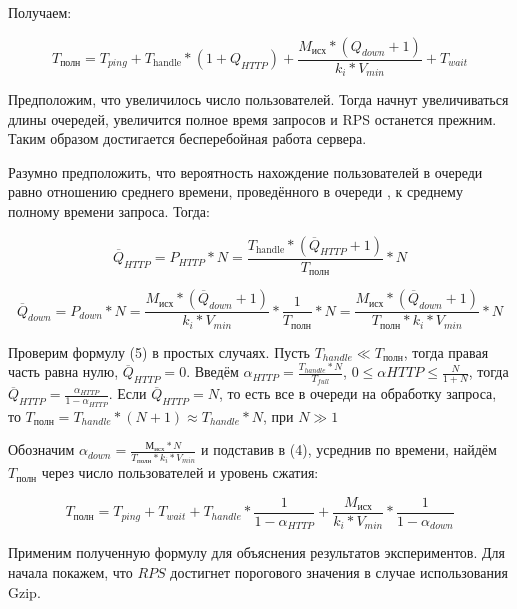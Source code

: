 \documentclass[12pt]{article}
\begin{document}
Получаем:

\[
    T_{\text{полн}} = T_{ping} + T_{\text{handle}}*(1 + Q_{HTTP}) + \frac{M_{\text{исх}}*(Q_{down} + 1)}{k_{i}*V_{min}} + T_{wait}
\]

Предположим, что увеличилось число пользователей. Тогда начнут увеличиваться длины очередей, увеличится полное время запросов
и RPS останется прежним. Таким образом достигается бесперебойная работа сервера.

Разумно предположить, что вероятность нахождение пользователей в очереди равно отношению среднего времени, проведённого в очереди
, к среднему полному времени запроса. Тогда:

\begin{equation}
    \overline{Q}_{HTTP} = P_{HTTP} * N = \frac{T_{\text{handle}} * (\overline{Q}_{HTTP} + 1)}{T_{\text{полн}}} * N
\end{equation}

\begin{equation}
    \overline{Q}_{down} = P_{down} * N = \frac{M_{\text{исх}}*(\overline{Q}_{down} + 1)}{k_{i}*V_{min}} * \frac{1}{T_{\text{полн}}} * N = \frac{M_{\text{исх}}*(\overline{Q}_{down} + 1)}{T_{\text{полн}} * k_{i}*V_{min}} * N
\end{equation}

\begin{spacing}{2.0}
    Проверим формулу (5) в простых случаях. Пусть $T_{handle} \ll T_{\text{полн}}$, тогда правая часть равна нулю, $\overline{Q}_{HTTP} = 0$.
    Введём $\alpha_{HTTP} = \frac{T_{handle} * N}{T_{full}}$, $0 \le \alpha{HTTP} \le \frac{N}{1+N}$, тогда $\overline{Q}_{HTTP} = \frac{\alpha_{HTTP}}{1 - \alpha_{HTTP}}$.
    Если $\overline{Q}_{HTTP} = N$, то есть все в очереди на обработку запроса,
    то $T_{\text{полн}} = T_{handle}*(N+1) \approx T_{handle}*N$, при  $N \gg 1$
\end{spacing}

Обозначим $\alpha_{down} = \frac{М_{\text{исх}} * N}{T_{\text{полн}}*k_{i}*V_{min}}$ и подставив в (4),
усреднив по времени, найдём $T_{\text{полн}}$ через число пользователей и уровень сжатия:

\begin{equation}
    T_{\text{полн}} = T_{ping} + T_{wait} + T_{handle}*\frac{1}{1 - \alpha_{HTTP}} + \frac{M_{\text{исх}}}{k_{i}*V_{min}} * \frac{1}{1 - \alpha_{down}}
\end{equation}

Применим полученную формулу для объяснения результатов экспериментов. Для начала покажем, что $RPS$ достигнет порогового значения в случае использования Gzip.
\end{document}
